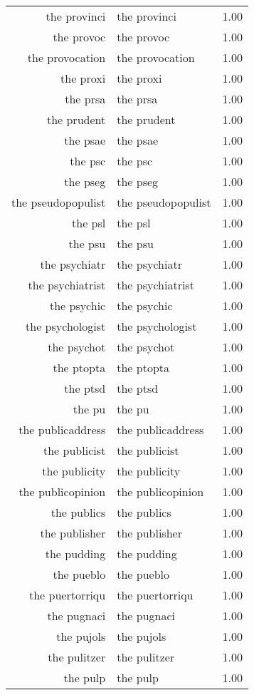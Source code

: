 \begin{table}[ht]
\begin{tabular}{rlr}
  the provinci & the provinci & 1.00 \\ 
  the provoc & the provoc & 1.00 \\ 
  the provocation & the provocation & 1.00 \\ 
  the proxi & the proxi & 1.00 \\ 
  the prsa & the prsa & 1.00 \\ 
  the prudent & the prudent & 1.00 \\ 
  the psae & the psae & 1.00 \\ 
  the psc & the psc & 1.00 \\ 
  the pseg & the pseg & 1.00 \\ 
  the pseudopopulist & the pseudopopulist & 1.00 \\ 
  the psl & the psl & 1.00 \\ 
  the psu & the psu & 1.00 \\ 
  the psychiatr & the psychiatr & 1.00 \\ 
  the psychiatrist & the psychiatrist & 1.00 \\ 
  the psychic & the psychic & 1.00 \\ 
  the psychologist & the psychologist & 1.00 \\ 
  the psychot & the psychot & 1.00 \\ 
  the ptopta & the ptopta & 1.00 \\ 
  the ptsd & the ptsd & 1.00 \\ 
  the pu & the pu & 1.00 \\ 
  the publicaddress & the publicaddress & 1.00 \\ 
  the publicist & the publicist & 1.00 \\ 
  the publicity & the publicity & 1.00 \\ 
  the publicopinion & the publicopinion & 1.00 \\ 
  the publics & the publics & 1.00 \\ 
  the publisher & the publisher & 1.00 \\ 
  the pudding & the pudding & 1.00 \\ 
  the pueblo & the pueblo & 1.00 \\ 
  the puertorriqu & the puertorriqu & 1.00 \\ 
  the pugnaci & the pugnaci & 1.00 \\ 
  the pujols & the pujols & 1.00 \\ 
  the pulitzer & the pulitzer & 1.00 \\ 
  the pulp & the pulp & 1.00 \\ 

\end{tabular}
\end{table}
